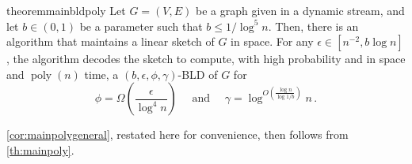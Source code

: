 \documentclass[epsfig,letter,11pt]{article}
\numberwithin{equation}{section}
\DeclareMathOperator*{\poly}{poly}
\begin{document}
\begin{restatable}{theorem}{mainbldpoly}
	\label{th:mainpoly}
	Let $G=(V, E)$ be a graph given in a dynamic stream, and let $b \in (0,1)$ be a parameter such that $b \le 1/\log^5 n$. Then, there is an algorithm that maintains a linear sketch of $G$ in  space. For any $\epsilon \in [n^{-2}, b \log n]$, the algorithm decodes the sketch to compute, with high probability and in  space and $\poly(n)$ time, a $(b, \epsilon, \phi, \gamma)$-BLD of $G$ for
	\begin{equation*}
		\phi = \Omega\left(\frac{\epsilon}{\log^4 n}\right) \quad \text{ and } \quad \gamma = \log^{O\left(\frac{\log n}{\log 1/b}\right)} n\, .
	\end{equation*}
\end{restatable}
\noindent
\cref{cor:mainpolygeneral}, restated here for convenience, then follows from \cref{th:mainpoly}.
\end{document}
